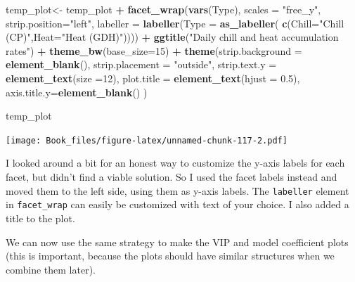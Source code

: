 \documentclass[
]{book}
\newenvironment{Shaded}{\begin{snugshade}}{\end{snugshade}}
\newcommand{\DataTypeTok}[1]{\textcolor[rgb]{0.13,0.29,0.53}{#1}}
\newcommand{\DecValTok}[1]{\textcolor[rgb]{0.00,0.00,0.81}{#1}}
\newcommand{\FloatTok}[1]{\textcolor[rgb]{0.00,0.00,0.81}{#1}}
\newcommand{\KeywordTok}[1]{\textcolor[rgb]{0.13,0.29,0.53}{\textbf{#1}}}
\newcommand{\NormalTok}[1]{#1}
\newcommand{\OperatorTok}[1]{\textcolor[rgb]{0.81,0.36,0.00}{\textbf{#1}}}
\newcommand{\StringTok}[1]{\textcolor[rgb]{0.31,0.60,0.02}{#1}}
\begin{document}
\begin{Shaded}
\begin{Highlighting}[]
\NormalTok{temp_plot<-}\StringTok{ }\NormalTok{temp_plot }\OperatorTok{+}
\StringTok{  }\KeywordTok{facet_wrap}\NormalTok{(}\KeywordTok{vars}\NormalTok{(Type), }\DataTypeTok{scales =} \StringTok{"free_y"}\NormalTok{,}
             \DataTypeTok{strip.position=}\StringTok{"left"}\NormalTok{,}
             \DataTypeTok{labeller =} \KeywordTok{labeller}\NormalTok{(}\DataTypeTok{Type =} \KeywordTok{as_labeller}\NormalTok{(}
               \KeywordTok{c}\NormalTok{(}\DataTypeTok{Chill=}\StringTok{"Chill (CP)"}\NormalTok{,}\DataTypeTok{Heat=}\StringTok{"Heat (GDH)"}\NormalTok{)))) }\OperatorTok{+}
\StringTok{  }\KeywordTok{ggtitle}\NormalTok{(}\StringTok{"Daily chill and heat accumulation rates"}\NormalTok{) }\OperatorTok{+}
\StringTok{  }\KeywordTok{theme_bw}\NormalTok{(}\DataTypeTok{base_size=}\DecValTok{15}\NormalTok{) }\OperatorTok{+}\StringTok{ }
\StringTok{  }\KeywordTok{theme}\NormalTok{(}\DataTypeTok{strip.background =} \KeywordTok{element_blank}\NormalTok{(),}
        \DataTypeTok{strip.placement =} \StringTok{"outside"}\NormalTok{,}
        \DataTypeTok{strip.text.y =} \KeywordTok{element_text}\NormalTok{(}\DataTypeTok{size =}\DecValTok{12}\NormalTok{),}
        \DataTypeTok{plot.title =} \KeywordTok{element_text}\NormalTok{(}\DataTypeTok{hjust =} \FloatTok{0.5}\NormalTok{),}
        \DataTypeTok{axis.title.y=}\KeywordTok{element_blank}\NormalTok{()}
\NormalTok{        )}

\NormalTok{temp_plot}
\end{Highlighting}
\end{Shaded}

\texttt{[image: Book\_files/figure-latex/unnamed-chunk-117-2.pdf]}

I looked around a bit for an honest way to customize the y-axis labels for each facet, but didn't find a viable solution. So I used the facet labels instead and moved them to the left side, using them as y-axis labels. The \texttt{labeller} element in \texttt{facet\_wrap} can easily be customized with text of your choice. I also added a title to the plot.

We can now use the same strategy to make the VIP and model coefficient plots (this is important, because the plots should have similar structures when we combine them later).
\end{document}
